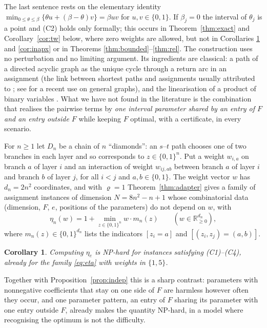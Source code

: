 \documentclass[11pt]{amsart}
\theoremstyle{plain}
\newtheorem{corollary}[theorem]{Corollary}
\theoremstyle{definition}
\theoremstyle{remark}
\newcommand{\R}{\mathbb{R}}
\begin{document}
The last sentence rests on the elementary identity $\min_{0\le\theta\le\beta}\{\theta u+(\beta-\theta)v\}=\beta uv$ for
$u,v\in\{0,1\}$. If $\beta_j=0$ the interval of $\theta_j$ is a point and \textup{(C2)} holds only formally; this
occurs in Theorem~\ref{thm:exact} and Corollary~\ref{cor:tw} below, where zero weights are allowed, but not in Corollaries \ref{cor:np} and
\ref{cor:inapx} or in Theorems \ref{thm:bounded}--\ref{thm:rel}. The construction uses no perturbation and no
limiting argument. Its ingredients are classical: a path of a directed acyclic graph as the unique cycle through a
return arc in an assignment (the link between shortest paths and assignments usually attributed to \cite{HM}; see
\cite[Section~IV-A]{MS} for a recent use on general graphs), and the linearisation of a product of binary variables
\cite{GW}. What we have not found in the literature is the
combination that realises the pairwise terms by \emph{one interval parameter shared by an entry of $F$ and an entry
outside $F$} while keeping $F$ optimal, with a certificate, in every scenario.

For $n\ge1$ let $D_n$ be a chain of $n$ ``diamonds'': an $s$--$t$ path chooses one of two branches in each layer
and so corresponds to $z\in\{0,1\}^n$. Put a weight $w_{i,a}$ on branch $a$ of layer $i$ and an interaction of
weight $w_{ij,ab}$ between branch $a$ of layer $i$ and branch $b$ of layer $j$, for all $i<j$ and $a,b\in\{0,1\}$.
The weight vector $w$ has $d_n=2n^2$ coordinates, and with $\varrho=1$ Theorem~\ref{thm:adapter} gives a family of
assignment instances of dimension $N=8n^2-n+1$ whose combinatorial data (dimension, $F$, $e$, positions of the
parameters) do not depend on $w$, with
\begin{equation}\label{eq:eta}
 \eta_n(w)=1+\min_{z\in\{0,1\}^n}w\cdot m_n(z)\qquad(w\in\R^{d_n}_{\ge0}),
\end{equation}
where $m_n(z)\in\{0,1\}^{d_n}$ lists the indicators $[z_i=a]$ and $[(z_i,z_j)=(a,b)]$.

\begin{corollary}\label{cor:np}
Computing $\eta_e$ is NP-hard for instances satisfying \textup{(C1)--(C4)}, already for the family
\eqref{eq:eta} with weights in $\{1,5\}$.
\end{corollary}

Together with Proposition~\ref{prop:indep} this is a sharp contrast: parameters with nonnegative coefficients that
stay on one side of $F$ are harmless however often they occur, and one parameter pattern, an entry of $F$ sharing its parameter with one entry
outside $F$, already makes the quantity NP-hard, in a model where recognising the optimum is not the difficulty.
\end{document}

